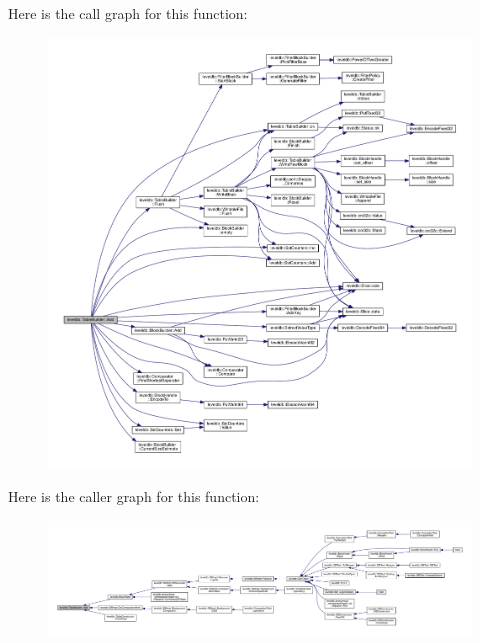 Here is the call graph for this function\+:\nopagebreak
\begin{figure}[H]
\begin{center}
\leavevmode
\includegraphics[width=350pt]{classleveldb_1_1_table_builder_a37bd347cb6340215475ac9b42dc19d10_cgraph}
\end{center}
\end{figure}




Here is the caller graph for this function\+:
\nopagebreak
\begin{figure}[H]
\begin{center}
\leavevmode
\includegraphics[width=350pt]{classleveldb_1_1_table_builder_a37bd347cb6340215475ac9b42dc19d10_icgraph}
\end{center}
\end{figure}


\hypertarget{classleveldb_1_1_table_builder_a6e37a5ddc82161e8665f2fba08031c24}{}
